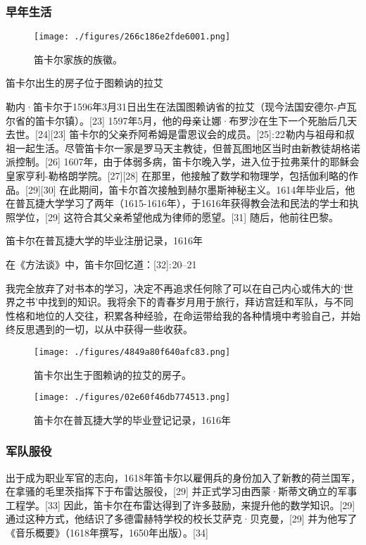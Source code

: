\subsubsection{早年生活}
\begin{figure}[ht]
\centering
\texttt{[image: ./figures/266c186e2fde6001.png]}
\caption{笛卡尔家族的族徽。} \label{fig_DKE_1}
\end{figure}
笛卡尔出生的房子位于图赖讷的拉艾

勒内·笛卡尔于1596年3月31日出生在法国图赖讷省的拉艾（现今法国安德尔-卢瓦尔省的笛卡尔镇）。[23] 1597年5月，他的母亲让娜·布罗沙在生下一个死胎后几天去世。[24][23] 笛卡尔的父亲乔阿希姆是雷恩议会的成员。[25]: 22 勒内与祖母和叔祖一起生活。尽管笛卡尔一家是罗马天主教徒，但普瓦图地区当时由新教徒胡格诺派控制。[26] 1607年，由于体弱多病，笛卡尔晚入学，进入位于拉弗莱什的耶稣会皇家亨利-勒格朗学院。[27][28] 在那里，他接触了数学和物理学，包括伽利略的作品。[29][30] 在此期间，笛卡尔首次接触到赫尔墨斯神秘主义。1614年毕业后，他在普瓦捷大学学习了两年（1615-1616年），于1616年获得教会法和民法的学士和执照学位，[29] 这符合其父亲希望他成为律师的愿望。[31] 随后，他前往巴黎。

笛卡尔在普瓦捷大学的毕业注册记录，1616年

在《方法谈》中，笛卡尔回忆道：[32]: 20–21

我完全放弃了对书本的学习，决定不再追求任何除了可以在自己内心或伟大的‘世界之书’中找到的知识。我将余下的青春岁月用于旅行，拜访宫廷和军队，与不同性格和地位的人交往，积累各种经验，在命运带给我的各种情境中考验自己，并始终反思遇到的一切，以从中获得一些收获。
\begin{figure}[ht]
\centering
\texttt{[image: ./figures/4849a80f640afc83.png]}
\caption{笛卡尔出生于图赖讷的拉艾的房子。} \label{fig_DKE_2}
\end{figure}
\begin{figure}[ht]
\centering
\texttt{[image: ./figures/02e60f46db774513.png]}
\caption{笛卡尔在普瓦捷大学的毕业登记记录，1616年} \label{fig_DKE_3}
\end{figure}
\subsubsection{军队服役}
出于成为职业军官的志向，1618年笛卡尔以雇佣兵的身份加入了新教的荷兰国军，在拿骚的毛里茨指挥下于布雷达服役，[29] 并正式学习由西蒙·斯蒂文确立的军事工程学。[33] 因此，笛卡尔在布雷达得到了许多鼓励，来提升他的数学知识。[29] 通过这种方式，他结识了多德雷赫特学校的校长艾萨克·贝克曼，[29] 并为他写了《音乐概要》（1618年撰写，1650年出版）。[34]

